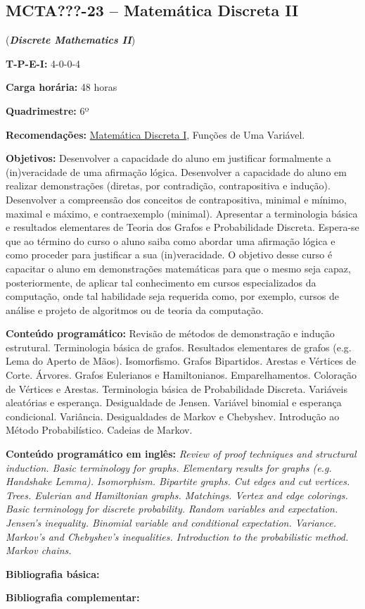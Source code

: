 \documentclass[class=article, crop=false]{standalone}
\begin{document}
\subsection{MCTA???-23 -- Matemática Discreta II}
\label{disc:mdII}

(\textbf{\textit{Discrete Mathematics II}})

\begin{center}
	\begin{minipage}{0.85\textwidth}
		\textbf{T-P-E-I:} 4-0-0-4

		\textbf{Carga horária:} 48 horas

		\textbf{Quadrimestre:} 6º

		\textbf{Recomendações:} 
        \hyperref[disc:mdI]{Matemática Discreta I},
        Funções de Uma Variável.

	\end{minipage}
\end{center}

\textbf{Objetivos:}
Desenvolver a capacidade do aluno em justificar formalmente a (in)veracidade de
uma afirmação lógica.
Desenvolver a capacidade do aluno em realizar demonstrações (diretas, por
contradição, contrapositiva e indução).
Desenvolver a compreensão dos conceitos de contrapositiva, minimal e mínimo,
maximal e máximo, e contraexemplo (minimal).
Apresentar a terminologia básica e resultados elementares de Teoria dos Grafos
e Probabilidade Discreta.
Espera-se que ao término do curso o aluno saiba como abordar uma afirmação
lógica e como proceder para justificar a sua (in)veracidade.
O objetivo desse curso é capacitar o aluno em demonstrações matemáticas para
que o mesmo seja capaz, posteriormente, de aplicar tal conhecimento em cursos
especializados da computação, onde tal habilidade seja requerida como, por
exemplo, cursos de análise e projeto de algoritmos ou de teoria da computação.

\textbf{Conteúdo programático:}
Revisão de métodos de demonstração e indução estrutural.
Terminologia básica de grafos.
Resultados elementares de grafos (e.g. Lema do Aperto de Mãos).
Isomorfismo.
Grafos Bipartidos.
Arestas e Vértices de Corte.
Árvores.
Grafos Eulerianos e Hamiltonianos.
Emparelhamentos.
Coloração de Vértices e Arestas.
Terminologia básica de Probabilidade Discreta.
Variáveis aleatórias e esperança.
Desigualdade de Jensen.
Variável binomial e esperança condicional.
Variância.
Desigualdades de Markov e Chebyshev.
Introdução ao Método Probabilístico.
Cadeias de Markov.

\textbf{Conteúdo programático em inglês:}
\textit{Review of proof techniques and structural induction.
Basic terminology for graphs.
Elementary results for graphs (e.g. Handshake Lemma).
Isomorphism.
Bipartite graphs.
Cut edges and cut vertices.
Trees.
Eulerian and Hamiltonian graphs.
Matchings.
Vertex and edge colorings.
Basic terminology for discrete probability.
Random variables and expectation.
Jensen's inequality.
Binomial variable and conditional expectation.
Variance.
Markov's and Chebyshev's inequalities.
Introduction to the probabilistic method.
Markov chains.}

\newrefsection
\textbf{Bibliografia básica:}
\nocite{2008-bondy-murty,2012-rosen-etal,2017-mitzenmacher-upfal}
\printbibliography

\newrefsection
\textbf{Bibliografia complementar:}
\nocite{2018-diestel,1996-west,2008-ash,2010-ross}
\printbibliography
\end{document}
